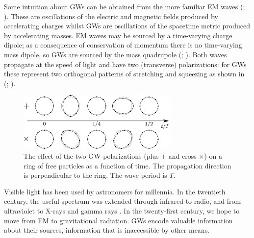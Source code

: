 Some intuition about GWs can be obtained from the more familiar EM waves (\citealt[sections 46--48, 66--67]{Landau1975}; \citealt[sections 7.1, 9.1--9.3]{Jackson1999}). These are oscillations of the electric and magnetic fields produced by accelerating charges whilst GWs are oscillations of the spacetime metric produced by accelerating masses. EM waves may be sourced by a time-varying charge dipole; as a consequence of conservation of momentum there is no time-varying mass dipole, so GWs are sourced by the mass quadrupole (\citealt[section 18.5]{Hobson2006}; \citealt[section 15.4]{Rindler2006}). Both waves propagate at the speed of light and have two (transverse) polarizations: for GWs these represent two orthogonal patterns of stretching and squeezing as shown in  (\citealt[section 34]{Dirac1996}; \citealt[section 18.4]{Hobson2006}).
\begin{figure}
  \centering
  \includegraphics[width=0.7\textwidth]{./images/Polarization}
    \caption{The effect of the two GW polarizations (plus $+$ and cross $\times$) on a ring of free particles as a function of time. The propagation direction is perpendicular to the ring. The wave period is $T$.}   
    \label{fig:plus-cross} 
\end{figure}

Visible light has been used by astronomers for millennia. In the twentieth century, the useful spectrum was extended through infrared to radio, and from ultraviolet to X-rays and gamma rays \citep[chapter 7]{Longair2006}. In the twenty-first century, we hope to move from EM to gravitational radiation. GWs encode valuable information about their sources, information that is inaccessible by other means.

